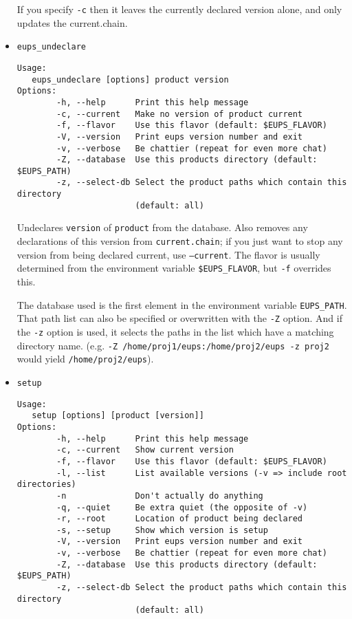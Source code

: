 \documentclass{article}
\newcommand{\code}[1]{\texttt{#1}}
\begin{document}
\begin{itemize}
If you specify \code{-c} then it leaves the currently declared version alone, and
only updates the current.chain.


  \item \code{eups\_undeclare}
\begin{verbatim}
Usage:
   eups_undeclare [options] product version
Options:
        -h, --help      Print this help message
        -c, --current   Make no version of product current
        -f, --flavor    Use this flavor (default: $EUPS_FLAVOR)
        -V, --version   Print eups version number and exit
        -v, --verbose   Be chattier (repeat for even more chat)
        -Z, --database  Use this products directory (default: $EUPS_PATH)
        -z, --select-db Select the product paths which contain this directory 
                        (default: all)
\end{verbatim}
  
Undeclares \code{version} of \code{product} from the database. Also
removes any declarations of this version from \code{current.chain}; if
you just want to stop any version from being declared current, use
\code{--current}. The flavor is usually determined from the
environment variable \code{\$EUPS\_FLAVOR}, but \code{-f} overrides
this. 

The database used is the first element in the environment
variable \code{EUPS\_PATH}. That path list can also be specified or
overwritten with the \code{-Z} option. And if the \code{-z} option is
used, it selects the paths in the list which have a matching directory
name. (e.g. \code{-Z /home/proj1/eups:/home/proj2/eups -z proj2} would
yield \code{/home/proj2/eups}).


\item \code{setup}
\begin{verbatim}
Usage:
   setup [options] [product [version]]
Options:
        -h, --help      Print this help message
        -c, --current   Show current version
        -f, --flavor    Use this flavor (default: $EUPS_FLAVOR)
        -l, --list      List available versions (-v => include root directories)
        -n              Don't actually do anything
        -q, --quiet     Be extra quiet (the opposite of -v)
        -r, --root      Location of product being declared
        -s, --setup     Show which version is setup
        -V, --version   Print eups version number and exit
        -v, --verbose   Be chattier (repeat for even more chat)
        -Z, --database  Use this products directory (default: $EUPS_PATH)
        -z, --select-db Select the product paths which contain this directory 
                        (default: all)
\end{verbatim}


\end{itemize}
\end{document}

